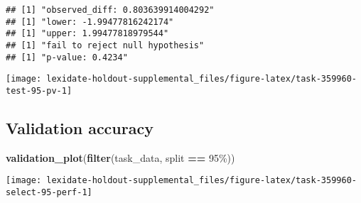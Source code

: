 \documentclass[
]{book}
\newenvironment{Shaded}{\begin{snugshade}}{\end{snugshade}}
\newcommand{\AttributeTok}[1]{\textcolor[rgb]{0.13,0.29,0.53}{#1}}
\newcommand{\DecValTok}[1]{\textcolor[rgb]{0.00,0.00,0.81}{#1}}
\newcommand{\FunctionTok}[1]{\textcolor[rgb]{0.13,0.29,0.53}{\textbf{#1}}}
\newcommand{\NormalTok}[1]{#1}
\newcommand{\OtherTok}[1]{\textcolor[rgb]{0.56,0.35,0.01}{#1}}
\newcommand{\SpecialCharTok}[1]{\textcolor[rgb]{0.81,0.36,0.00}{\textbf{#1}}}
\newcommand{\StringTok}[1]{\textcolor[rgb]{0.31,0.60,0.02}{#1}}
\begin{document}
\begin{Shaded}
\end{Shaded}

\begin{verbatim}
## [1] "observed_diff: 0.803639914004292"
## [1] "lower: -1.99477816242174"
## [1] "upper: 1.99477818979544"
## [1] "fail to reject null hypothesis"
## [1] "p-value: 0.4234"
\end{verbatim}

\texttt{[image: lexidate-holdout-supplemental\_files/figure-latex/task-359960-test-95-pv-1]}

\hypertarget{validation-accuracy-49}{%
\subsection{Validation accuracy}\label{validation-accuracy-49}}

\begin{Shaded}
\begin{Highlighting}[]
\FunctionTok{validation\_plot}\NormalTok{(}\FunctionTok{filter}\NormalTok{(task\_data, split }\SpecialCharTok{==} \StringTok{\textquotesingle{}95\%\textquotesingle{}}\NormalTok{))}
\end{Highlighting}
\end{Shaded}

\texttt{[image: lexidate-holdout-supplemental\_files/figure-latex/task-359960-select-95-perf-1]}
\end{document}
